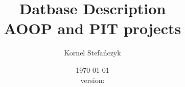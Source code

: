 


\title{Datbase Description\\ \large{AOOP and PIT projects}}
\author{Kornel Stefańczyk}
\date{\today\\version: }



\maketitle






